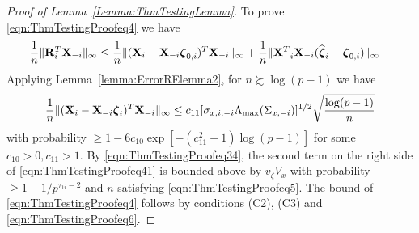 \documentclass[12pt, letterpaper]{article}
\numberwithin{equation}{section}
\begin{document}
\begin{proof}[Proof of Lemma~\ref{Lemma:ThmTestingLemma}]
To prove \eqref{eqn:ThmTestingProofeq4} we have
%
\begin{align}\label{eqn:ThmTestingProofeq41}
\frac{1}{n} \| {\mathbf{R}}_i^T {\mathbf{X}}_{-i} \|_\infty & \leq
\frac{1}{n} \| ({\mathbf{X}}_i - {\mathbf{X}}_{-i} {\boldsymbol{\zeta}}_{0,i})^T {\mathbf{X}}_{-i} \|_\infty +
\frac{1}{n} \| {\mathbf{X}}_{-i}^T {\mathbf{X}}_{-i} ( \widehat {{\boldsymbol{\zeta}}}_i - {\boldsymbol{\zeta}}_{0,i}) \|_\infty
\end{align}
%
Applying Lemma~\ref{lemma:ErrorRElemma2}, for $n \succsim \log(p-1)$ we have
%
%
\begin{align}
\frac{1}{n} \| ({\mathbf{X}}_i -  {\mathbf{X}}_{-i} {\boldsymbol{\zeta}}_i )^T {\mathbf{X}}_{-i} \|_\infty \leq 
c_{11} [ \sigma_{x,i,-i} \Lambda_{\max} (\Sigma_{x, -i}) ]^{1/2} \sqrt{\frac{ \log (p-1)}{n}}
\end{align}
%
with probability $\geq 1 - 6c_{10} \exp [-(c_{11}^2-1) \log (p-1)]$ for some $c_{10} >0, c_{11} > 1$. By \eqref{eqn:ThmTestingProofeq34}, the second term on the right side of \eqref{eqn:ThmTestingProofeq41} is bounded above by $v_\zeta V_x$ with probability $ \geq 1 - 1/p^{\tau_{1 i}-2}$ and $n$ satisfying \eqref{eqn:ThmTestingProofeq5}. The bound of \eqref{eqn:ThmTestingProofeq4} follows by conditions (C2), (C3) and \eqref{eqn:ThmTestingProofeq6}.
\end{proof}


%

\end{document}
